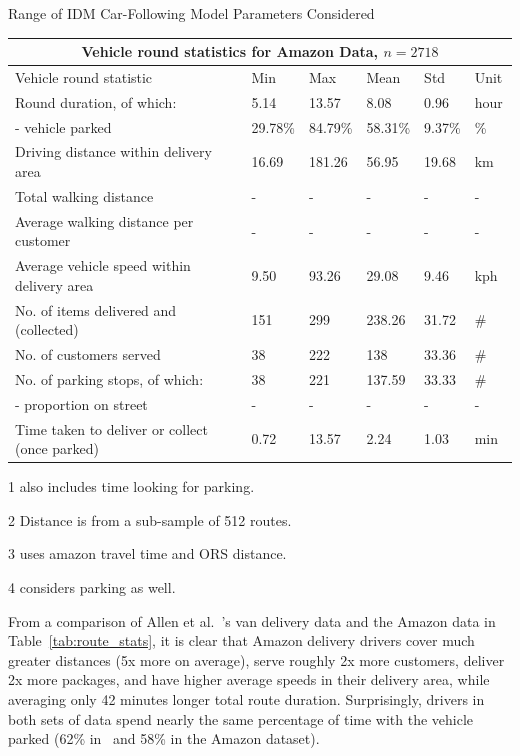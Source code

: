 \documentclass[12pt]{article}
\theoremstyle{plain}
\numberwithin{equation}{section}
\newcommand{\etal}{et al.}
\begin{document}
\begin{center}
 \caption{Range of IDM Car-Following Model Parameters Considered}
\renewcommand{\arraystretch}{1.1}
\small
\begin{threeparttable}
\begin{tabular}{p{7.5cm}|p{1.05cm}|p{1.05cm}|p{1.05cm}|p{1cm}|p{1cm}}
 \hline
 \multicolumn{6}{c}{Vehicle round statistics for Amazon Data, $n=2718$} \\
 \hline
 Vehicle round statistic & Min & Max& Mean & Std & Unit\\
 \hline
Round duration, of which:   & 5.14    &13.57 &   8.08 &   0.96 &   hour\\
- vehicle parked~\tnote{1}&   29.78\%  & 84.79\%   & 58.31\% &   9.37\% &   \%\\
Driving distance within delivery area~\tnote{2} & 16.69 & 181.26 &  56.95 &   19.68 & km\\
Total walking distance    &- &- &  - &   - &   -\\
Average walking distance per customer    &- &- &  - &   - &   -\\
Average vehicle speed within delivery area~\tnote{3}    &9.50 & 93.26&  29.08 &   9.46 &   kph\\
No. of items delivered and (collected)&   151  & 299& 238.26 &   31.72 &   \# \\
No. of customers served& 38  & 222   &138 &   33.36 &   \#\\
No. of parking stops, of which:& 38  & 221   &137.59 &   33.33 &   \#\\
- proportion on street& -  & -& - &  - &  -\\
Time taken to deliver or collect (once parked)& 0.72  & 13.57& 2.24 &   1.03 &   min~\tnote{4}\\
 \hline
\end{tabular}
\begin{tablenotes}
     \item[1] also includes time looking for parking.
     \item[2] Distance is from a sub-sample of 512 routes.
     \item[3] uses amazon travel time and ORS distance.
     \item[4] considers parking as well.
   \end{tablenotes}
\end{threeparttable}
\label{tab:route_stats}
\end{center}

From a comparison of Allen \etal~\cite{london_ftc2050}'s van delivery data and the Amazon data in Table~\ref{tab:route_stats}, it is clear that Amazon delivery drivers cover much greater distances (5x more on average), serve roughly 2x more customers, deliver 2x more packages, and have higher average speeds in their delivery area, while averaging only 42 minutes longer total route duration. Surprisingly, drivers in both sets of data spend nearly the same percentage of time with the vehicle parked (62\% in~\cite{london_ftc2050} and 58\% in the Amazon dataset). 
\end{document}
